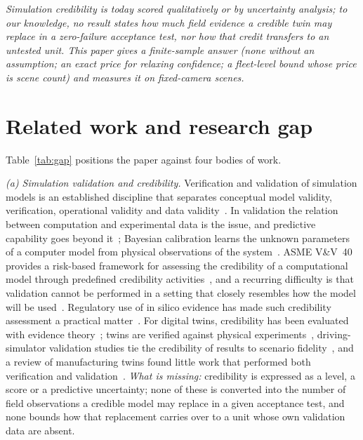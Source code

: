\emph{Simulation credibility is today scored qualitatively or by uncertainty analysis; to our knowledge, no result states how much field
evidence a credible twin may replace in a zero-failure acceptance test, nor how that credit transfers to an untested
unit. This paper gives a finite-sample answer (none without an assumption; an exact price for relaxing confidence; a
fleet-level bound whose price is scene count) and measures it on \nMainScenes{} fixed-camera scenes.}

\section{Related work and research gap}\label{sec:related}

Table~\ref{tab:gap} positions the paper against four bodies of work.



\emph{(a) Simulation validation and credibility.} Verification and validation of simulation models is an established
discipline that separates conceptual model validity, verification, operational validity and data
validity~\cite{sargent2013vv,oberkampf2010vv}. In validation the relation between computation and experimental data is
the issue, and predictive capability goes beyond it~\cite{oberkampf2004vvcomp,roy2011vvuq}; Bayesian calibration
learns the unknown parameters of a computer model from physical observations of the system~\cite{kennedy2001calibration}.
ASME V\&V~40 provides a risk-based framework for assessing the credibility of a computational model through predefined
credibility activities~\cite{asme2018vv40,aldieri2023vv40}, and a recurring difficulty is that validation cannot be
performed in a setting that closely resembles how the model will be used~\cite{pathmanathan2017applicability}. Regulatory
use of in silico evidence has made such credibility assessment a practical matter~\cite{viceconti2021insilico}. For digital
twins, credibility has been evaluated with evidence theory~\cite{shi2025dtcredibility}; twins are verified against
physical experiments~\cite{wang2025maglevdt,ye2023structuraldt}, driving-simulator validation studies tie the credibility
of results to scenario fidelity~\cite{zhang2025drivingsim}, and a review of manufacturing twins found little work that
performed both verification and validation~\cite{bitencourt2024dtvv}.
\emph{What is missing:} credibility is expressed as a level, a score or a predictive uncertainty; none of these is
converted into the number of field observations a credible model may replace in a given acceptance test, and none
bounds how that replacement carries over to a unit whose own validation data are absent.

